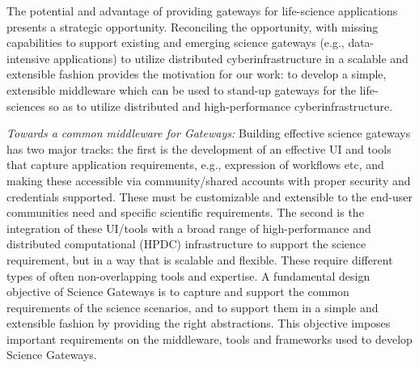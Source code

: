 \documentclass[]{svjour3}
\begin{document}

The potential and advantage of providing gateways for life-science
applications presents a strategic opportunity.  Reconciling the
opportunity, with missing capabilities to support existing and
emerging science gateways (e.g., data-intensive applications) to
utilize distributed cyberinfrastructure in a scalable and extensible
fashion provides the motivation for our work: to develop a simple,
extensible middleware which can be used to stand-up gateways for the
life-sciences so as to utilize distributed and high-performance
cyberinfrastructure.



{\it Towards a common middleware for Gateways:} Building effective
science gateways has two major tracks: the first is the development of
an effective UI and tools that capture application requirements, e.g.,
expression of workflows etc, and making these accessible via
community/shared accounts with proper security and credentials
supported. These must be customizable and extensible to the end-user
communities need and specific scientific requirements. The second is
the integration of these UI/tools with a broad range of
high-performance and distributed computational (HPDC) infrastructure
to support the science requirement, but in a way that is scalable and
flexible.  These require different types of often non-overlapping
tools and expertise.  A fundamental design objective of Science
Gateways is to capture and support the common requirements of the
science scenarios, and to support them in a simple and extensible
fashion by providing the right abstractions.  This objective imposes
important %
requirements on the middleware, tools and frameworks used to develop
Science Gateways.
\end{document}
